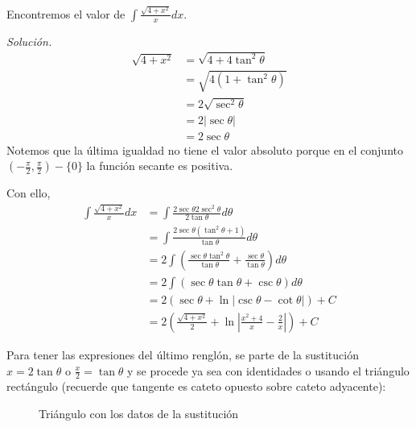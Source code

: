   \begin{ejemplo} Encontremos el valor de $\int\frac{\sqrt{4+x^{2}}}{x}dx$.
  \end{ejemplo}

  \emph{Solución.} 
  \begin{align*}
    \sqrt{4+x^{2}}&=\sqrt{4+4\tan ^{2}\theta }\\
    &=\sqrt{4(1+\tan ^{2}\theta )}\\
    &=2\sqrt{\sec ^{2}\theta }\\
    &=2|\sec \theta |\\
    &=2\sec \theta
  \end{align*}
  Notemos que la última igualdad no tiene el valor absoluto porque en el conjunto $\left(-\frac{\pi}{2},\frac{\pi}{2}\right)-\{0\}$ la función secante es positiva.

  Con ello,
  \begin{align*}
    \int \frac{\sqrt{4+x^{2}}}{x}dx&=\int \frac{2\sec \theta 2\sec ^{2}\theta }{2\tan \theta }d\theta \\
    &=\int \frac{2\sec \theta (\tan ^{2}\theta +1)}{\tan \theta }d\theta \\
    &=2\int \left(\frac{\sec \theta \tan ^{2}\theta }{\tan \theta }+\frac{\sec \theta}{\tan \theta }\right)d\theta\\
    &=2\int \left( \sec \theta\tan\theta +\csc \theta\right) d\theta\\
    &=2\left( \sec\theta+\ln\vert\csc\theta-\cot\theta\vert\right) +C\\
    &=2\left( \frac{\sqrt{4+x^2}}{2}+\ln\left\vert \frac{x^2+4}{x}-\frac{2}{x}\right\vert\right) +C
  \end{align*}

  Para tener las expresiones del último renglón, se parte de la sustitución $x=2\tan\theta$ o $\frac{x}{2}=\tan\theta$ y se procede ya sea con identidades o usando el triángulo rectángulo (recuerde que tangente es cateto opuesto sobre cateto adyacente):

  \begin{figure}[H]
    \centering
    \caption{Triángulo con los datos de la sustitución}
    \propia
  \end{figure}

